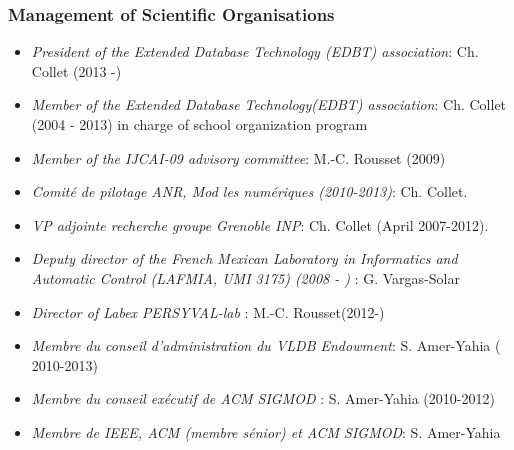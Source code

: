 \subsubsection*{Management of Scientific Organisations}

\begin{itemize}
\setlength{\itemindent}{-0.5cm}
\setlength{\itemsep}{-0.1cm}

\item {\it President of the Extended Database Technology (EDBT) association}: Ch. Collet (2013 -)

\item {\it Member of the Extended Database Technology(EDBT) association}: Ch. Collet (2004 - 2013) in charge of  school organization program

\item {\it Member of the IJCAI-09 advisory committee}: M.-C. Rousset (2009)

\item {\it Comit{\'e} de pilotage ANR, Mod les num{\'e}riques (2010-2013)}: Ch. Collet.

\item {\it VP adjointe recherche groupe Grenoble INP}: Ch. Collet (April 2007-2012).

\item {\it Deputy director of the French Mexican Laboratory in Informatics and Automatic Control (LAFMIA, UMI 3175) (2008 - ) }:  G. Vargas-Solar

\item {\it Director of Labex PERSYVAL-lab  }:  M.-C. Rousset(2012-)

\item \emph{Membre du conseil d'administration du VLDB Endowment}:  S. Amer-Yahia ( 2010-2013)

\item \emph{Membre du conseil ex\'ecutif de ACM SIGMOD }:  S. Amer-Yahia (2010-2012)

\item \emph{Membre de IEEE, ACM (membre s\'enior) et ACM SIGMOD}:  S. Amer-Yahia

\end{itemize}

